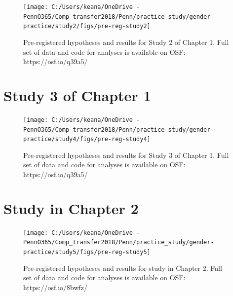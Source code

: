 \documentclass[a4paper, nobind]{templates/ociamthesis}
\newcommand*{\bibtitle}{Works Cited}
\begin{document}
\begin{figure}
\texttt{[image: C:/Users/keana/OneDrive - PennO365/Comp\_transfer2018/Penn/practice\_study/gender-practice/study2/figs/pre-reg-study2]} \caption{Pre-registered hypotheses and results for Study 2 of Chapter 1. Full set of data and code for analyses is available on OSF: https://osf.io/q39a5/}\label{fig:pre-reg-study2}
\end{figure}

\hypertarget{study-3-of-chapter-1}{%
\section{Study 3 of Chapter 1}\label{study-3-of-chapter-1}}

\begin{figure}
\texttt{[image: C:/Users/keana/OneDrive - PennO365/Comp\_transfer2018/Penn/practice\_study/gender-practice/study4/figs/pre-reg-study4]} \caption{Pre-registered hypotheses and results for Study 3 of Chapter 1. Full set of data and code for analyses is available on OSF: https://osf.io/q39a5/}\label{fig:pre-reg-study4}
\end{figure}

\hypertarget{study-in-chapter-2}{%
\section{Study in Chapter 2}\label{study-in-chapter-2}}

\begin{figure}
\texttt{[image: C:/Users/keana/OneDrive - PennO365/Comp\_transfer2018/Penn/practice\_study/gender-practice/study5/figs/pre-reg-study5]} \caption{Pre-registered hypotheses and results for study in Chapter 2. Full set of data and code for analyses is available on OSF: https://osf.io/8bwfz/}\label{fig:pre-reg-study5}
\end{figure}


\setlength{\baselineskip}{0pt} %

{\renewcommand*\MakeUppercase[1]{#1}%
\printbibliography[heading=bibintoc,title={\bibtitle}]}
\end{document}
